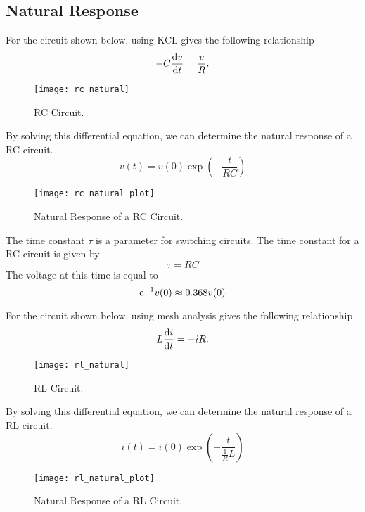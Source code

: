 \documentclass{article}
\begin{document}
\subsection{Natural Response}
\begin{definition}
    For the circuit shown below, using KCL gives the following relationship
    \begin{equation*}
        -C \dv{v}{t} = \frac{v}{R}.
    \end{equation*}
    \begin{figure}[H]
        \centering
        \texttt{[image: rc\_natural]}
        \caption{RC Circuit.}
    \end{figure}
    By solving this differential equation, we can determine the natural response of a 
    RC circuit.
    \begin{equation*}
        v(t) = v(0)\exp{\left( -\frac{t}{RC} \right)}
    \end{equation*}
    \begin{figure}[H]
        \centering
        \texttt{[image: rc\_natural\_plot]}
        \caption{Natural Response of a RC Circuit.}
    \end{figure}
\end{definition}
\begin{definition}
    The time constant $\tau$ is a parameter for switching circuits. The time constant for a RC circuit is given by
    \begin{equation*}
        \tau = RC
    \end{equation*}
    The voltage at this time is equal to
    \begin{equation*}
        \mathrm{e}^{-1}v(0) \approx 0.368v(0)
    \end{equation*} 
\end{definition}
\begin{definition}
    For the circuit shown below, using mesh analysis gives the following relationship
    \begin{equation*}
        L \dv{i}{t} = -iR.
    \end{equation*}
    \begin{figure}[H]
        \centering
        \texttt{[image: rl\_natural]}
        \caption{RL Circuit.}
    \end{figure}
    By solving this differential equation, we can determine the natural response of a 
    RL circuit.
    \begin{equation*}
        i(t) = i(0)\exp{\left( -\frac{t}{\frac{1}{R}L} \right)}
    \end{equation*} 
    \begin{figure}[H]
        \centering
        \texttt{[image: rl\_natural\_plot]}
        \caption{Natural Response of a RL Circuit.}
    \end{figure}
\end{definition}
\end{document}
